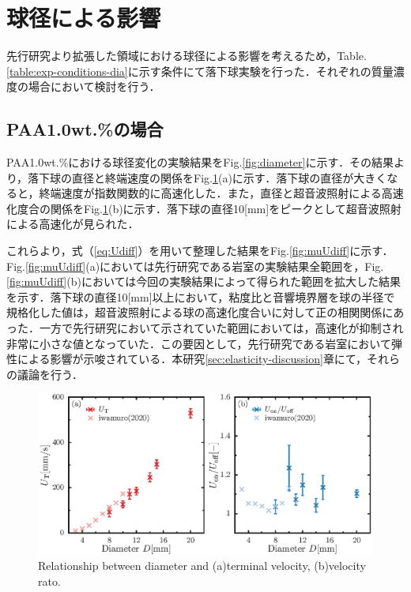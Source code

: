 \section{球径による影響}
先行研究より拡張した領域における球径による影響を考えるため，Table.\ref{table:exp-conditions-dia}に示す条件にて落下球実験を行った．それぞれの質量濃度の場合において検討を行う．

\subsection{PAA1.0wt.\%の場合}
PAA1.0wt.\%における球径変化の実験結果をFig.\ref{fig:diameter}に示す．その結果より，落下球の直径と終端速度の関係をFig.\ref{fig:diaUT}(a)に示す．落下球の直径が大きくなると，終端速度が指数関数的に高速化した．また，直径と超音波照射による高速化度合の関係をFig.\ref{fig:diaUT}(b)に示す．落下球の直径10[mm]をピークとして超音波照射による高速化が見られた．

これらより，式（\ref{eq:Udiff}）を用いて整理した結果をFig.\ref{fig:muUdiff}に示す．Fig.\ref{fig:muUdiff}(a)においては先行研究である岩室\cite{ref:8}の実験結果全範囲を，Fig.\ref{fig:muUdiff}(b)においては今回の実験結果によって得られた範囲を拡大した結果を示す．落下球の直径10[mm]以上において，粘度比と音響境界層を球の半径で規格化した値は，超音波照射による球の高速化度合いに対して正の相関関係にあった．一方で先行研究において示されていた範囲においては，高速化が抑制され非常に小さな値となっていた．この要因として，先行研究である岩室\cite{ref:8}において弾性による影響が示唆されている．本研究\ref{sec:elasticity-discussion}章にて，それらの議論を行う．

\begin{figure}[ht]
    \centering
    \includegraphics[width=1\textwidth]{./5-Results/diaUT_Udiff.eps}
    \caption{Relationship between diameter and (a)terminal velocity, (b)velocity rato.}
    \label{fig:diaUT}
\end{figure}

